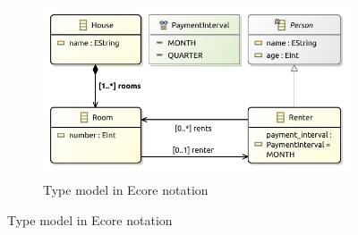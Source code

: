\begin{figure}[p]
    \centering
    \begin{subfigure}{\textwidth}
        \centering
        \includegraphics{images/03_formalisations/02_ecore_formalisation/type_model_example.pdf}
        \caption{Type model in Ecore notation}
    \end{subfigure}
    

\end{figure}
